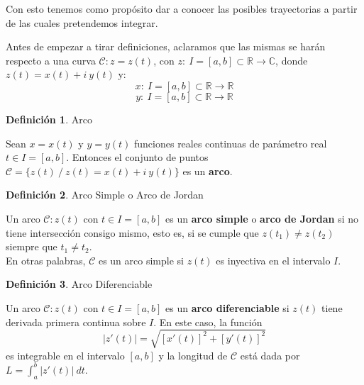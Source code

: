\documentclass[12pt]{article}
\theoremstyle{definition}
\newtheorem{definition}{Definici\'on}[section]
\theoremstyle{theorem}
\theoremstyle{corolary}
\begin{document}
Con esto tenemos como prop\'osito dar a conocer las posibles trayectorias a partir de las cuales pretendemos integrar.

Antes de empezar a tirar definiciones, aclaramos que las mismas se har\'an respecto a una curva $\mathcal{C}: z = z(t)$, con $z:\:I=[a, b]\subset \mathbb{R} \rightarrow \mathbb{C}$, donde $z(t) = x(t)+i\ y(t)$ y: $$x:\ I=[a,b] \subset \mathbb{R} \rightarrow \mathbb{R}$$ $$y:\ I=[a,b] \subset \mathbb{R} \rightarrow \mathbb{R}$$
\linebreak

\colorbox{orange!40!white!80}{\parbox{\linewidth}{
 \theoremstyle{definition}
 \begin{definition}{Arco}

Sean $x=x(t)$ y $y=y(t)$ funciones reales continuas de par\'ametro real $t\in I = [a, b]$. Entonces el conjunto de puntos $\mathcal{C} = \{ z(t)\ /\ z(t)=x(t)+i\ y(t)\}$ es un \textbf{arco}.  	
 \end{definition}}}
\linebreak
\linebreak

\colorbox{orange!40!white!80}{\parbox{\linewidth}{
\theoremstyle{definition}
\begin{definition}{Arco Simple o Arco de Jordan}

Un arco $\mathcal{C}: z(t)$ con $t\in I = [a,b]$ es un \textbf{arco simple} o \textbf{arco de Jordan} si no tiene intersecci\'on consigo mismo, esto es, si se cumple que $z(t_1)\neq z(t_2)$ siempre que $t_1\neq t_2$.\\

En otras palabras, $\mathcal{C}$ es un arco simple si $z(t)$ es inyectiva en el intervalo $I$.
\end{definition}}}
\linebreak
\linebreak

\colorbox{orange!40!white!80}{\parbox{\linewidth}{
\theoremstyle{definition}
\begin{definition}{Arco Diferenciable}

Un arco $\mathcal{C}: z(t)$ con $t\in I = [a,b]$ es un \textbf{arco diferenciable} si $z(t)$ tiene derivada primera continua sobre $I$. En este caso, la funci\'on $$|z'(t)| = \sqrt{[x'(t)]^2+[y'(t)]^2}$$ es integrable en el intervalo $[a, b]$ y la longitud de $\mathcal{C}$ est\'a dada por $L=\int_a^b|z'(t)|\ dt$.
\end{definition}}}
\linebreak
\linebreak
\end{document}
